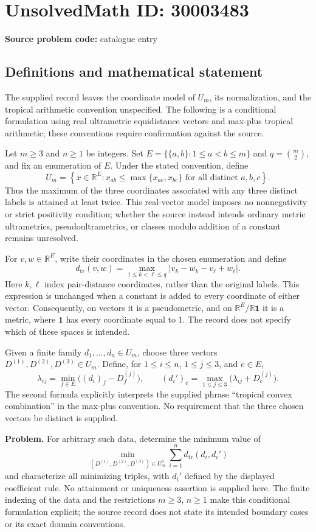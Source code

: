 \documentclass[11pt]{article}
\newcommand{\R}{\mathbb{R}}
\begin{document}
\section*{UnsolvedMath ID: 30003483}
\textbf{Source problem code:} catalogue entry
\subsection{Definitions and mathematical statement}
The supplied record leaves the coordinate model of \(U_m\), its normalization, and the tropical arithmetic convention unspecified. The following is a conditional formulation using real ultrametric equidistance vectors and max-plus tropical arithmetic; these conventions require confirmation against the source.

Let \(m\geq 3\) and \(n\geq 1\) be integers. Set \(E=\{\{a,b\}:1\leq a<b\leq m\}\) and \(q=\binom{m}{2}\), and fix an enumeration of \(E\). Under the stated convention, define
\[
U_m=\left\{x\in\R^E:x_{ab}\leq\max\{x_{ac},x_{bc}\}\text{ for all distinct }a,b,c\right\}.
\]
Thus the maximum of the three coordinates associated with any three distinct labels is attained at least twice. This real-vector model imposes no nonnegativity or strict positivity condition; whether the source instead intends ordinary metric ultrametrics, pseudoultrametrics, or classes modulo addition of a constant remains unresolved.

For \(v,w\in\R^E\), write their coordinates in the chosen enumeration and define
\[
d_{\mathrm{tr}}(v,w)=\max_{1\leq k<\ell\leq q}\left|v_k-w_k-v_\ell+w_\ell\right|.
\]
Here \(k,\ell\) index pair-distance coordinates, rather than the original labels. This expression is unchanged when a constant is added to every coordinate of either vector. Consequently, on vectors it is a pseudometric, and on \(\R^E/\R\mathbf{1}\) it is a metric, where \(\mathbf{1}\) has every coordinate equal to \(1\). The record does not specify which of these spaces is intended.

Given a finite family \(d_1,\ldots,d_n\in U_m\), choose three vectors \(D^{(1)},D^{(2)},D^{(3)}\in U_m\). Define, for \(1\leq i\leq n\), \(1\leq j\leq 3\), and \(e\in E\),
\[
\lambda_{ij}=\min_{f\in E}\bigl((d_i)_f-D^{(j)}_f\bigr),\qquad
(d_i')_e=\max_{1\leq j\leq 3}\bigl(\lambda_{ij}+D^{(j)}_e\bigr).
\]
The second formula explicitly interprets the supplied phrase ``tropical convex combination'' in the max-plus convention. No requirement that the three chosen vectors be distinct is supplied.

\textbf{Problem.} For arbitrary such data, determine the minimum value of
\[
\min_{(D^{(1)},D^{(2)},D^{(3)})\in U_m^3}
\sum_{i=1}^{n}d_{\mathrm{tr}}(d_i,d_i')
\]
and characterize all minimizing triples, with \(d_i'\) defined by the displayed coefficient rule. No attainment or uniqueness assertion is supplied here. The finite indexing of the data and the restrictions \(m\geq3\), \(n\geq1\) make this conditional formulation explicit; the source record does not state its intended boundary cases or its exact domain conventions.
\end{document}
